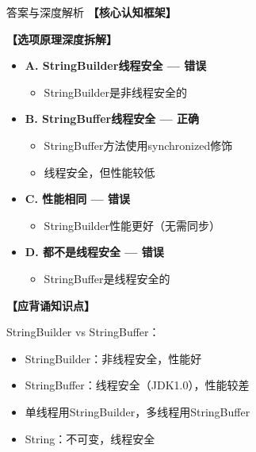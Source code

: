 \documentclass[12pt, a4paper]{ctexart}
\begin{document}
\begin{enumerate}[label=\textbf{\arabic*.}]
\begin{bluebox}{答案与深度解析}
		      \textbf{【核心认知框架】}

		      \textbf{【选项原理深度拆解】}
					  \begin{itemize}[label={}, leftmargin=*, nosep]


		      \item \textbf{A. StringBuilder线程安全 — 错误}
					  \begin{itemize}[label={}, nosep]
		      
			      \item StringBuilder是非线程安全的
		      

					  \end{itemize}
		      \item \textbf{B. StringBuffer线程安全 — 正确}
					  \begin{itemize}[label={}, nosep]
		      
			      \item StringBuffer方法使用synchronized修饰
			      \item 线程安全，但性能较低
		      

					  \end{itemize}
		      \item \textbf{C. 性能相同 — 错误}
					  \begin{itemize}[label={}, nosep]
		      
			      \item StringBuilder性能更好（无需同步）
		      

					  \end{itemize}
		      \item \textbf{D. 都不是线程安全 — 错误}
					  \begin{itemize}[label={}, nosep]
		      
			      \item StringBuffer是线程安全的
		      

		      
					  \end{itemize}
					  \end{itemize}
\textbf{【应背诵知识点】}

		      StringBuilder vs StringBuffer：
		      \begin{itemize}[label={}, nosep]
			      \item StringBuilder：非线程安全，性能好
			      \item StringBuffer：线程安全（JDK1.0），性能较差
			      \item 单线程用StringBuilder，多线程用StringBuffer
			      \item String：不可变，线程安全
		      \end{itemize}
	      \end{bluebox}


\end{enumerate}
\end{document}
